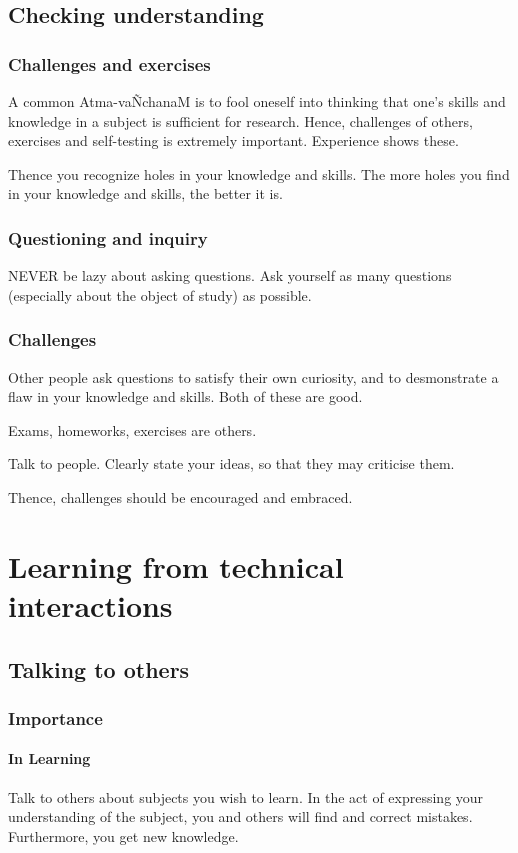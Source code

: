 \documentclass[oneside, article]{memoir}
\begin{document}
\section{Checking understanding}
\subsection{Challenges and exercises}
A common Atma-va\~NchanaM is to fool oneself into thinking that one's skills and knowledge in a subject is sufficient for research. Hence, challenges of others, exercises and self-testing is extremely important. Experience shows these.

Thence you recognize holes in your knowledge and skills. The more holes you find in your knowledge and skills, the better it is.

\subsection{Questioning and inquiry}
NEVER be lazy about asking questions. Ask yourself as many questions (especially about the object of study) as possible.

\subsection{Challenges}
Other people ask questions to satisfy their own curiosity, and to desmonstrate a flaw in your knowledge and skills. Both of these are good.

Exams, homeworks, exercises are others.

Talk to people. Clearly state your ideas, so that they may criticise them.

Thence, challenges should be encouraged and embraced.

\chapter{Learning from technical interactions}
\section{Talking to others}
\subsection{Importance}
\subsubsection{In Learning}
Talk to others about subjects you wish to learn. In the act of expressing your understanding of the subject, you and others will find and correct mistakes. Furthermore, you get new knowledge.
\end{document}
